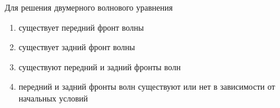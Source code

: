 Для решения двумерного волнового уравнения

\begin{enumerate}[label=\arabic*)]
    \item существует передний фронт волны
    \item существует задний фронт волны
    \item существуют передний и задний фронты волн
    \item передний и задний фронты волн существуют или нет в зависимости от начальных условий
\end{enumerate}

